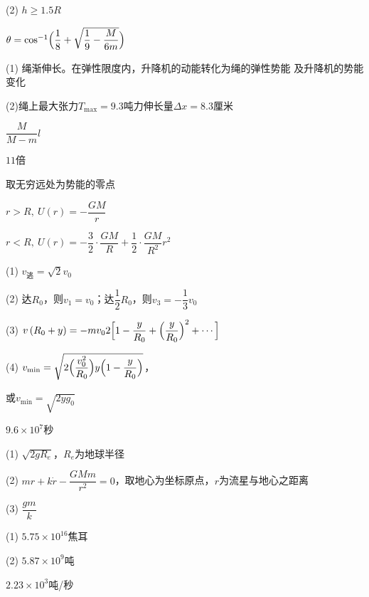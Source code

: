 (2) $ h \geqslant 1 . 5 R   $

\answer $ \theta = \cos ^ { - 1 } \Bigl( \dfrac { 1 } { 8 } + \sqrt { \dfrac { 1 } { 9 } - \dfrac { M } { 6 m } } \Bigr)   $

\answer (1) 绳渐伸长。在弹性限度内，升降机的动能转化为绳的弹性势能
及升降机的势能变化

(2)绳上最大张力$ T_\text{max}=9.3 $吨力伸长量$  \Delta x = 8 . 3   $厘米

\answer $ \dfrac { M } { M - m } l   $

\answer $ 11 $倍

\answer 取无穷远处为势能的零点

$ r > R,~ U \left( r \right) = - \dfrac { G M } { r }$

$ r < R,~ U \left( r \right) = - \dfrac { 3 } { 2 } \cdot \dfrac { G M } { R } + \dfrac { 1 } { 2 } \cdot \dfrac { G M } { R ^ { 2 } } r ^ { 2 } $

\answer (1) $ v _ \text{逃} = \sqrt { 2 } v _ { 0 }  $

(2) 达$ R_0 $，则$  v _ { 1 } = v _ { 0 }  $；达$ \dfrac { 1 } { 2 } R _ { 0 } $，则$ v _ { 3 } = - \dfrac { 1 } { 3 } v _ { 0 }  $

(3) $v\left(R_{0}+y\right)=-m v_{0} 2\Bigl[1-\dfrac{y}{R_{0}}+\Bigl(\dfrac{y}{R_{0}}\Bigr)^{2}+\cdots\Bigr]$

(4) $v_{\text{min}}=\sqrt{2\Bigl(\dfrac{v_{0}^{2}}{R_{0}}\Bigr) y\Bigl(1-\dfrac{y}{R_{0}}\Bigr)}$，

或$v_{\text{min}} = \sqrt { 2 y g _ { 0 } } $

\answer $ 9 . 6 \times 1 0 ^ { 7 } $秒

\answer (1) $ \sqrt { 2 g R _ { e } }  $，$ R_e $为地球半径

(2) $ m r + k \dot{r} - \dfrac { G M m } { r ^ { 2 } } = 0  $，取地心为坐标原点，$ r $为流星与地心之距离

(3) $ \dfrac{g m}{k} $

\answer (1) $ 5 . 7 5 \times 1 0 ^ { 16 }   $焦耳

(2) $ 5.87\times 10 ^9 $吨

\answer $ 2 . 2 3 \times 1 0 ^ { 3 }  $吨/秒
